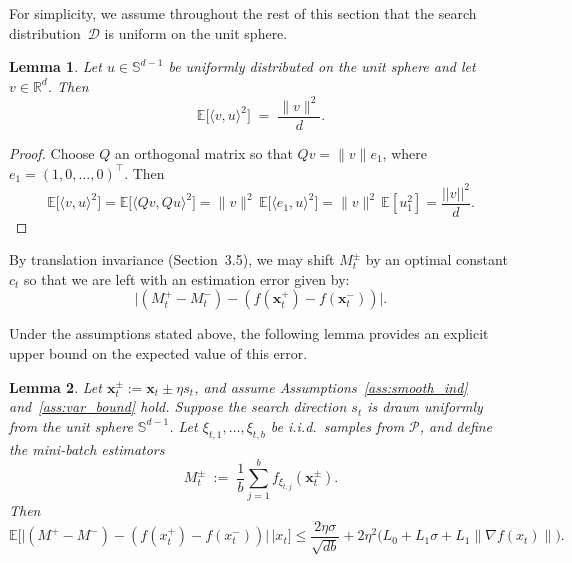 \documentclass[twoside]{article}
\theoremstyle{plain}
\newtheorem{lemma}{Lemma}[section]
\theoremstyle{definition}
\theoremstyle{remark}
\def\vx{{\bm{x}}}
\begin{document}
For simplicity, we assume throughout the rest of this section that the search distribution~$\mathcal{D}$ is uniform on the unit sphere.
\begin{propbox}
\begin{lemma}\label{lem:uuT}
Let $u\in\mathbb{S}^{d-1}$ be uniformly distributed on the unit sphere
and let $v\in\mathbb{R}^d$. Then
\[
\mathbb{E}\big[\langle v,u\rangle^2\big] \;=\; \frac{\|v\|^2}{d}.
\]

\end{lemma}
\end{propbox}

\begin{proof}
Choose $Q$ an orthogonal matrix so that
$Qv=\|v\|e_1$, where $e_1=(1,0,\dots,0)^\top$. Then
$$
\mathbb{E}\big[\langle v,u\rangle^2\big]
= \mathbb{E}\big[\langle Qv,Qu\rangle^2\big]
= \|v\|^2\,\mathbb{E}\big[\langle e_1,u\rangle^2\big]
= \|v\|^2\,\mathbb{E}[u_1^2]=\frac{||v||^2}{d}.$$
\end{proof}

By translation invariance (Section~3.5), we may shift $M_t^\pm$ by an optimal constant $c_t$ so that we are left with an estimation error given by:
\[
\big| (M_t^+ - M_t^-) - ( f(\vx_t^{+}) - f(\vx_t^{-})) \big|.
\]

Under the assumptions stated above, the following lemma provides an explicit upper bound on the expected value of this error.
\begin{propbox}
\begin{lemma}\label{lem:diff-exp-iso}
Let $\vx_t^\pm := \vx_t \pm \eta s_t$, and assume Assumptions~\ref{ass:smooth_ind} and~\ref{ass:var_bound} hold. 
Suppose the search direction $s_t$ is drawn uniformly from the unit sphere $\mathbb{S}^{d-1}$. 
Let $\xi_{t,1},\ldots,\xi_{t,b}$ be i.i.d.\ samples from $\mathcal{P}$, and define the mini-batch estimators
\[
M_t^\pm \;:=\; \frac{1}{b}\sum_{j=1}^b f_{\xi_{t,j}}(\vx_t^\pm).
\]
Then
$$\mathbb{E}\big[\big|(M^+-M^-) - (f(x_t^+)-f(x_t^-))\big|  \, \big| x_t\big]\le\frac{2\eta \sigma}{\sqrt{db}}+ 2\eta^2\big(L_0+L_1\sigma + L_1\| \nabla f(x_t) \| \big).$$
\end{lemma}
\end{propbox}
\end{document}
